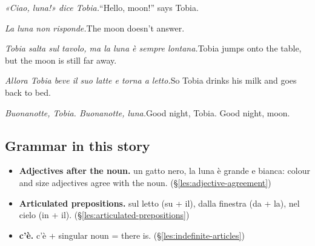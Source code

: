 \documentclass[11pt,a4paper,twoside,openright]{book}
\begin{document}
\begin{sentences}
\item\relax \textit{«Ciao, luna!» dice Tobia.}\newline “Hello, moon!” says Tobia.
\item\relax \textit{La luna non risponde.}\newline The moon doesn't answer.
\item\relax \textit{Tobia salta sul tavolo, ma la luna è sempre lontana.}\newline Tobia jumps onto the table, but the moon is still far away.
\item\relax \textit{Allora Tobia beve il suo latte e torna a letto.}\newline So Tobia drinks his milk and goes back to bed.
\item\relax \textit{Buonanotte, Tobia. Buonanotte, luna.}\newline Good night, Tobia. Good night, moon.
\end{sentences}
\subsection*{Grammar in this story}
\begin{itemize}
\item\relax \textbf{Adjectives after the noun.} un gatto nero, la luna è grande e bianca: colour and size adjectives agree with the noun. (\S\ref{les:adjective-agreement})
\item\relax \textbf{Articulated prepositions.} sul letto (su + il), dalla finestra (da + la), nel cielo (in + il). (\S\ref{les:articulated-prepositions})
\item\relax \textbf{c'è.} c'è + singular noun = there is. (\S\ref{les:indefinite-articles})
\end{itemize}
\end{document}
